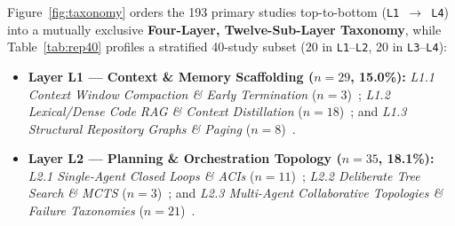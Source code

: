 \documentclass[10pt,twocolumn,a4paper]{article}
\begin{document}
Figure~\ref{fig:taxonomy} orders the 193 primary studies top-to-bottom (\texttt{L1 $\to$ L4}) into a mutually exclusive \textbf{Four-Layer, Twelve-Sub-Layer Taxonomy}, while Table~\ref{tab:rep40} profiles a stratified 40-study subset (20 in \texttt{L1}--\texttt{L2}, 20 in \texttt{L3}--\texttt{L4}):
\begin{itemize}[leftmargin=*,nosep]
    \item \textbf{Layer L1 --- Context \& Memory Scaffolding ($n = 29$, 15.0\%):} \emph{L1.1 Context Window Compaction \& Early Termination} ($n=3$)~\cite{liu2024lost,packer2023memgpt,guo2026eet}; \emph{L1.2 Lexical/Dense Code RAG \& Context Distillation} ($n=18$)~\cite{zhang2023repocoder,zhang2024codeagent,wang2025coderagbench,liu2024marscode,suresh2025cornstack,xie2025swefixer,guo2025repoaudit,yildiz2025benchmarking,ma2025thinking,mu2025experepair,ma2025swegpt,li2026contextbench,zhu2026swe,liu2026racebench,jia2026compressing,zhang2026sweexplore,desai2026swemarathon,lin2026run}; and \emph{L1.3 Structural Repository Graphs \& Paging} ($n=8$)~\cite{zhang2024autocoderover,liu2025codexgraph,ouyang2025repograph,tao2025code,chen2025locagent,chai2026reponav,pu2026typescript,chen2026measure}.
    \item \textbf{Layer L2 --- Planning \& Orchestration Topology ($n = 35$, 18.1\%):} \emph{L2.1 Single-Agent Closed Loops \& ACIs} ($n=11$)~\cite{yao2023react,zhang2023selfedit,schick2023toolformer,shinn2023reflexion,madaan2023selfrefine,chen2024teaching,yang2024sweagent,bouzenia2024repairagent,xia2024demystifying,wang2025openhands,pan2025training}; \emph{L2.2 Deliberate Tree Search \& MCTS} ($n=3$)~\cite{yao2023tree,zhou2024language,antoniades2024swesearch}; and \emph{L2.3 Multi-Agent Collaborative Topologies \& Failure Taxonomies} ($n=21$)~\cite{qian2024chatdev,hong2024metagpt,wu2024autogen,yang2023whitefox,islam2024mapcoder,tao2024magis,huang2024unidebugger,xu2025hallucination,ye2025prompt,cemri2025multiagent,ye2025adverintentagent,oueslati2025refagent,ananiadou2026hiras,zhang2026sgagent,wu2026guessing,ibrahimzada2026recodeagent,zhang2026understanding,peng2026playcoder,tian2026mumutestup,chen2026tracedev,wang2026paichecker}.

\end{itemize}
\end{document}
